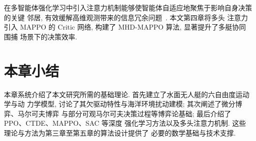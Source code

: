 在多智能体强化学习中引入注意力机制能够使智能体自适应地聚焦于影响自身决策的关键
邻居, 有效缓解高维观测带来的信息冗余问题~\cite{iqbal2019maac}. 本文第四章将多头
注意力引入 MAPPO 的 Critic 网络, 构建了 MHD-MAPPO 算法, 显著提升了多艇协同围捕
场景下的决策效率.

\section{本章小结}
\label{sec:prelim_summary}
本章系统介绍了本文研究所需的基础理论. 首先建立了水面无人艇的六自由度运动学与动
力学模型, 讨论了其欠驱动特性与海洋环境扰动建模; 其次阐述了微分博弈、马尔可夫博弈
与部分可观马尔可夫决策过程等博弈论基础; 最后介绍了 PPO、CTDE、MAPPO、SAC 等深度
强化学习方法以及多头注意力机制. 这些理论与方法为第三章至第五章的算法设计提供了
必要的数学基础与技术支撑.
